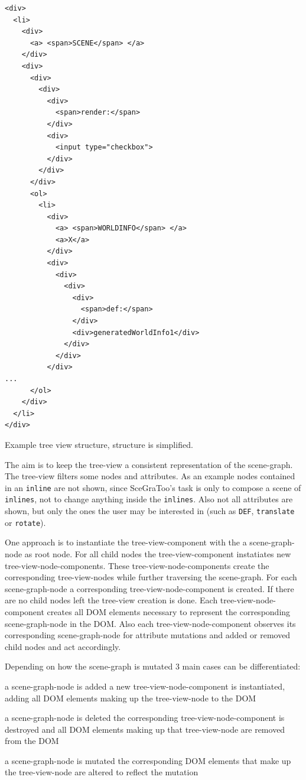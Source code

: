 \begin{listing}
  \begin{verbatim}
<div>
  <li>
    <div>
      <a> <span>SCENE</span> </a>
    </div>
    <div>
      <div>
        <div>
          <div>
            <span>render:</span>
          </div>
          <div>
            <input type="checkbox">
          </div>
        </div>
      </div>
      <ol>
        <li>
          <div>
            <a> <span>WORLDINFO</span> </a>
            <a>X</a>
          </div>
          <div>
            <div>
              <div>
                <div>
                  <span>def:</span>
                </div>
                <div>generatedWorldInfo1</div>
              </div>
            </div>
          </div>
...
      </ol>
    </div>
  </li>
</div>
  \end{verbatim}
  \caption{Example tree view structure, structure is simplified.}
  \label{list:tree-view}
\end{listing}

The aim is to keep the tree-view a consistent representation of the scene-graph.
The tree-view filters some nodes and attributes. As an example nodes contained
in an \texttt{inline} are not shown, since  SceGraToo's task is only to compose
a scene of \texttt{inlines}, not to change anything inside the \texttt{inlines}.
Also not all attributes are shown, but only the ones the user may be interested
in (such as \texttt{DEF}, \texttt{translate} or \texttt{rotate}).

One approach is to instantiate the tree-view-component with the a
scene-graph-node as root node. For all child nodes the tree-view-component
instatiates new tree-view-node-components. These tree-view-node-components
create the corresponding tree-view-nodes while further traversing the
scene-graph. For each scene-graph-node a corresponding tree-view-node-component
is created. If there are no child nodes left the tree-view creation is done.
Each tree-view-node-component creates all DOM elements necessary to represent
the corresponding scene-graph-node in the DOM. Also each
tree-view-node-component observes its corresponding scene-graph-node for
attribute mutations and added or removed child nodes and act accordingly.

Depending on how the scene-graph is mutated 3 main cases can be differentiated:

\begin{description*}
  \item[a scene-graph-node is added]
    a new tree-view-node-component is instantiated, adding all DOM elements making up the tree-view-node to the DOM
  \item[a scene-graph-node is deleted]
    the corresponding tree-view-node-component is destroyed and all DOM elements making up that tree-view-node are removed from the DOM
  \item[a scene-graph-node is mutated]
    the corresponding DOM elements that make up the  tree-view-node are altered to reflect the mutation
\end{description*}

